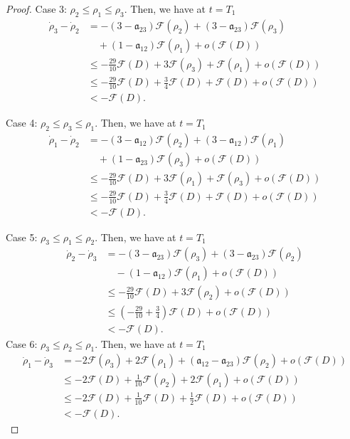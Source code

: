 \documentclass[reqno]{amsart}
\theoremstyle{plain}
\theoremstyle{definition}
\numberwithin{equation}{section}
\begin{document}
\begin{proof}
Case 3: $\rho_2\leq \rho_1\leq \rho_3$. Then, we have at $t=T_1$
\begin{align*}
\dot{\rho}_3-\dot{\rho}_2&=-\left(3-\mathfrak{a}_{23}\right)\mathcal{F}(\rho_2)+\left(3-\mathfrak{a}_{23}\right)\mathcal{F}(\rho_3)
\\
&\quad+\left(1-\mathfrak{a}_{12}\right)\mathcal{F}(\rho_1)+o\left(\mathcal{F}(D)\right)
\\
&\leq -\frac{29}{10}\mathcal{F}(D)+3\mathcal{F}(\rho_3)+\mathcal{F}(\rho_1)+o\left(\mathcal{F}(D)\right)
\\
&\leq -\frac{29}{10}\mathcal{F}(D)+\frac{3}{4}\mathcal{F}(D)+\mathcal{F}(D)+o\left(\mathcal{F}(D)\right)
\\
&<-\mathcal{F}(D).
\end{align*}

Case 4: $\rho_2\leq \rho_3\leq \rho_1$. Then, we have at $t=T_1$
\begin{align*}
\dot{\rho}_1-\dot{\rho}_2&=-\left(3-\mathfrak{a}_{12}\right)\mathcal{F}(\rho_2)+\left(3-\mathfrak{a}_{12}\right)\mathcal{F}(\rho_1)
\\
&\quad+\left(1-\mathfrak{a}_{23}\right)\mathcal{F}(\rho_3)+o\left(\mathcal{F}(D)\right)
\\
&\leq -\frac{29}{10}\mathcal{F}(D)+3\mathcal{F}(\rho_1)+\mathcal{F}(\rho_3)+o\left(\mathcal{F}(D)\right)
\\
&\leq -\frac{29}{10}\mathcal{F}(D)+\frac{3}{4}\mathcal{F}(D)+\mathcal{F}(D)+o\left(\mathcal{F}(D)\right)
\\
&<-\mathcal{F}(D).
\end{align*}

Case 5: $\rho_3\leq \rho_1\leq \rho_2$. Then, we have at $t=T_1$
\begin{align*}
\dot{\rho}_2-\dot{\rho}_3&=-\left(3-\mathfrak{a}_{23}\right)\mathcal{F}(\rho_3)+\left(3-\mathfrak{a}_{23}\right)\mathcal{F}(\rho_2)
\\
&\quad -\left(1-\mathfrak{a}_{12}\right)\mathcal{F}(\rho_1)+o\left(\mathcal{F}(D)\right)
\\
&\leq -\frac{29}{10}\mathcal{F}(D)+3\mathcal{F}(\rho_2)+o\left(\mathcal{F}(D)\right)
\\
&\leq \left(-\frac{29}{10}+\frac{3}{4}\right)\mathcal{F}(D)+o\left(\mathcal{F}(D)\right)
\\
&<-\mathcal{F}(D).
\end{align*}
Case 6: $\rho_3\leq \rho_2\leq \rho_1$. Then, we have at $t=T_1$
\begin{align*}
\dot{\rho}_1-\dot{\rho}_3&=-2\mathcal{F}(\rho_3)+2\mathcal{F}(\rho_1)+\left(\mathfrak{a}_{12}-\mathfrak{a}_{23}\right)\mathcal{F}(\rho_2)+o\left(\mathcal{F}(D)\right)
\\
&\leq -2\mathcal{F}(D)+\frac{1}{10}\mathcal{F}(\rho_2)+2\mathcal{F}(\rho_1)+o\left(\mathcal{F}(D)\right)
\\
&\leq  -2\mathcal{F}(D)+\frac{1}{10}\mathcal{F}(D)+\frac{1}{2}\mathcal{F}(D)+o\left(\mathcal{F}(D)\right)
\\
&<-\mathcal{F}(D).
\end{align*}


\end{proof}
\end{document}
